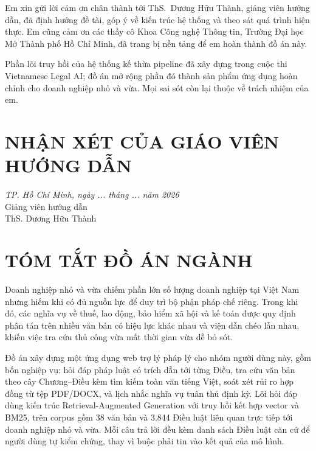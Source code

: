 \documentclass[12pt,a4paper]{report}
\numberwithin{equation}{chapter}
\numberwithin{figure}{chapter}
\numberwithin{table}{chapter}
\newcommand{\namBaoCao}{2026}
\newcommand{\gvhd}{ThS. Dương Hữu Thành}
\newcommand{\soLuat}{38}
\newcommand{\soDieu}{3.844}
\begin{document}
Em xin gửi lời cảm ơn chân thành tới ThS.~Dương Hữu Thành, giảng viên hướng dẫn,
đã định hướng đề tài, góp ý về kiến trúc hệ thống và theo sát quá trình hiện thực.
Em cũng cảm ơn các thầy cô Khoa Công nghệ Thông tin, Trường Đại học Mở Thành phố
Hồ Chí Minh, đã trang bị nền tảng để em hoàn thành đồ án này.

Phần lõi truy hồi của hệ thống kế thừa pipeline đã xây dựng trong cuộc thi
Vietnamese Legal AI; đồ án mở rộng phần đó thành sản phẩm ứng dụng hoàn chỉnh cho
doanh nghiệp nhỏ và vừa. Mọi sai sót còn lại thuộc về trách nhiệm của em.

\clearpage

\chapter*{NHẬN XÉT CỦA GIÁO VIÊN HƯỚNG DẪN}

\begin{flushright}
\textit{TP. Hồ Chí Minh, ngày ... tháng ... năm \namBaoCao}\\[2.5cm]
Giảng viên hướng dẫn\\[2.5cm]
\gvhd
\end{flushright}

\clearpage

\chapter*{TÓM TẮT ĐỒ ÁN NGÀNH}

Doanh nghiệp nhỏ và vừa chiếm phần lớn số lượng doanh nghiệp tại Việt Nam nhưng
hiếm khi có đủ nguồn lực để duy trì bộ phận pháp chế riêng. Trong khi đó, các
nghĩa vụ về thuế, lao động, bảo hiểm xã hội và kế toán được quy định phân tán
trên nhiều văn bản có hiệu lực khác nhau và viện dẫn chéo lẫn nhau, khiến việc
tra cứu thủ công vừa mất thời gian vừa dễ bỏ sót.

Đồ án xây dựng một ứng dụng web trợ lý pháp lý cho nhóm người dùng này, gồm bốn
nghiệp vụ: hỏi đáp pháp luật có trích dẫn tới từng Điều, tra cứu văn bản theo cây
Chương--Điều kèm tìm kiếm toàn văn tiếng Việt, soát xét rủi ro hợp đồng từ tệp
PDF/DOCX, và lịch nhắc nghĩa vụ tuân thủ định kỳ. Lõi hỏi đáp dùng kiến trúc
Retrieval-Augmented Generation với truy hồi kết hợp vector và BM25, trên corpus
gồm \soLuat{} văn bản và \soDieu{} Điều luật liên quan trực tiếp tới doanh nghiệp
nhỏ và vừa. Mỗi câu trả lời đều kèm danh sách Điều luật căn cứ để người dùng tự
kiểm chứng, thay vì buộc phải tin vào kết quả của mô hình.
\end{document}
